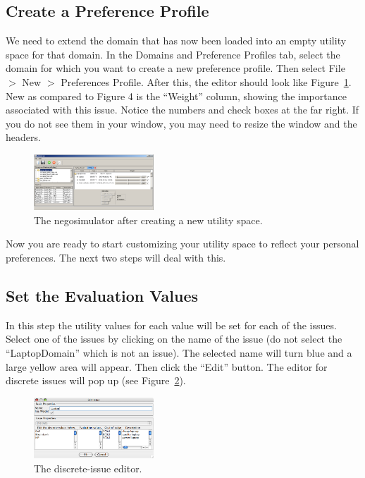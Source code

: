 \documentclass[]{article}
\begin{document}
\subsection{Create a Preference Profile}
We need to extend the domain that has now been loaded into an empty utility space for that domain. In the Domains and Preference Profiles tab, select the domain for which you want to create a new preference profile. Then select File $>$ New $>$ Preferences Profile. After this, the editor should look like Figure~\ref{Fig:negosimulator utility space created}. New as compared to Figure 4 is the ``Weight'' column, showing the importance associated with this issue. Notice the numbers and check boxes at the far right. If you do not see them in your window, you may need to resize the window and the headers.

\begin{figure}[htb]
	\centering
	\includegraphics[width=0.4\textwidth]{media/image8.png}
\caption{The negosimulator after creating a new utility space.}\label{Fig:negosimulator utility space created}
\end{figure}

Now you are ready to start customizing your utility space to reflect your personal preferences. The next two steps will deal with this.

\subsection{Set the Evaluation Values}
In this step the utility values for each value will be set for each of the issues. Select one of the issues by clicking on the name of the issue (do not select the ``LaptopDomain'' which is not an issue). The selected name will turn blue and a large yellow area will appear. Then click the ``Edit'' button. The editor for discrete issues will pop up (see Figure~\ref{Fig:discrete issue editor}).

\begin{figure}[htb]
	\centering
	\includegraphics[width=0.4\textwidth]{media/image9.png}
\caption{The discrete-issue editor.}\label{Fig:discrete issue editor}
\end{figure}
\end{document}
